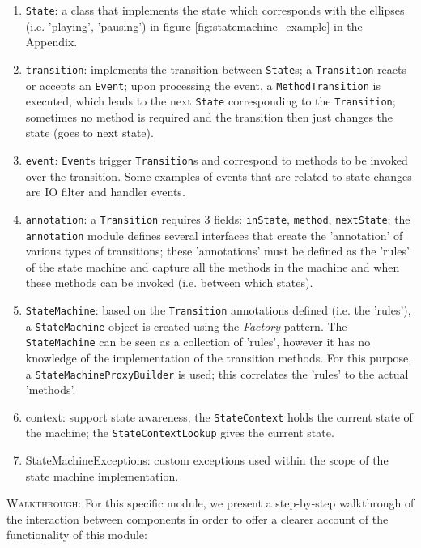 \begin{enumerate}
    \item \texttt{State}: a class that implements the state which corresponds with the ellipses (i.e. 'playing', 'pausing') in figure \ref{fig:statemachine_example} in the Appendix. 
    \item \texttt{transition}: implements the transition between \texttt{State}s; a \texttt{Transition} reacts or accepts an \texttt{Event}; upon processing the event, a \texttt{MethodTransition} is executed, which leads to the next \texttt{State} corresponding to the \texttt{Transition}; sometimes no method is required and the transition then just changes the state (goes to next state).
    \item \texttt{event}: \texttt{Event}s trigger \texttt{Transition}s and correspond to methods to be invoked over the transition. Some examples of events that are related to state changes are IO filter and handler events.
    \item \texttt{annotation}: a \texttt{Transition} requires 3 fields: \texttt{inState}, \texttt{method}, \texttt{nextState}; the \texttt{annotation} module defines several interfaces that create the 'annotation' of various types of transitions; these 'annotations' must be defined as the 'rules' of the state machine and capture all the methods in the machine and when these methods can be invoked (i.e. between which states).
    \item \texttt{StateMachine}: based on the \texttt{Transition} annotations defined (i.e. the 'rules'), a \texttt{StateMachine} object is created using the \textit{Factory} pattern. The \texttt{StateMachine} can be seen as a collection of 'rules', however it has no knowledge of the implementation of the transition methods. For this purpose, a \texttt{StateMachineProxyBuilder} is used; this correlates the 'rules' to the actual 'methods'.
    \item{context}: support state awareness; the \texttt{StateContext} holds the current state of the machine; the \texttt{StateContextLookup} gives the current state.
    \item{StateMachineExceptions}: custom exceptions used within the scope of the state machine implementation.
\end{enumerate}
\textsc{Walkthrough}: For this specific module, we present a step-by-step walkthrough of the interaction between components in order to offer a clearer account of the functionality of this module:
